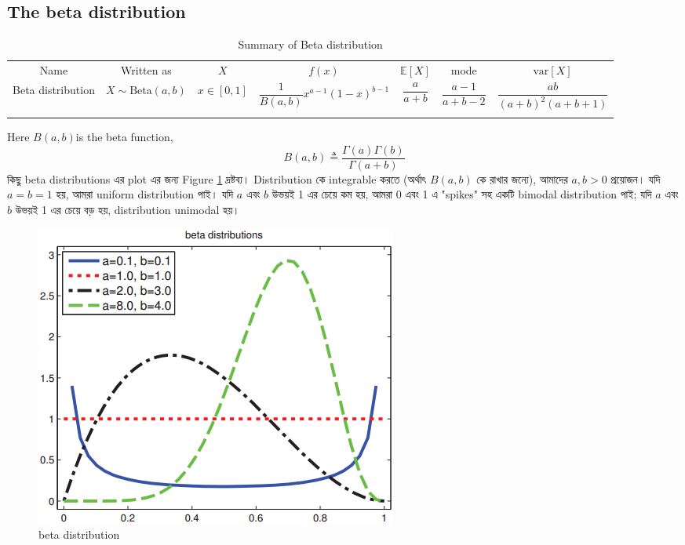 \documentclass[graybox, envcountchap, twocolumn]{styles/svmult}
\begin{document}
\subsection{The beta distribution}

\begin{table}
\caption{Summary of Beta distribution}\label{tab:beta-distribution}
\centering
\begin{tabular}{ccccccc}
\hline\noalign{\smallskip}
Name & Written as & $X$ & $f(x)$ & $\mathbb{E}[X]$ & mode & $\text{var}[X]$ \\
\noalign{\smallskip}\svhline\noalign{\smallskip}
Beta distribution & $X \sim \text{Beta}(a,b)$ & $x \in [0,1]$ & $\dfrac{1}{B(a,b)}x^{a-1}(1-x)^{b-1}$ & $\dfrac{a}{a+b}$ & $\dfrac{a-1}{a+b-2}$ & $\dfrac{ab}{(a+b)^2(a+b+1)}$ \\
\noalign{\smallskip}\hline
\end{tabular}
\end{table} 

Here $B(a, b)$is the beta function,
\begin{equation}
B(a,b) \triangleq \dfrac{\Gamma(a)\Gamma(b)}{\Gamma(a+b)}
\end{equation}
{\bengalifont কিছু beta distributions এর plot এর জন্য Figure \ref{fig:beta-distribution} দ্রষ্টব্য।  Distribution কে integrable করতে (অর্থাৎ $B(a, b)$ কে রাখার জন্যে), আমাদের $a, b >0$ প্রয়োজন। যদি $a=b=1$ হয়, আমরা uniform distribution পাই। যদি $a$ এবং $b$ উভয়ই 1 এর চেয়ে কম হয়, আমরা 0 এবং 1 এ "spikes" সহ একটি bimodal distribution পাই; যদি $a$ এবং $b$ উভয়ই 1 এর চেয়ে বড় হয়, distribution unimodal হয়।}


\begin{figure}[hbtp]
\centering
    \includegraphics[scale=.60]{beta-distribution.png}
\caption{beta distribution}
\label{fig:beta-distribution} 
\end{figure}
\end{document}
